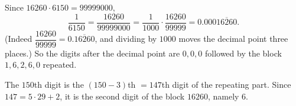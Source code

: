 Since $16260\cdot6150=99999000$,
\[
\dfrac{1}{6150}=\dfrac{16260}{99999000}=\dfrac{1}{1000}\cdot\dfrac{16260}{99999}=0.000\overline{16260}.
\]
(Indeed $\dfrac{16260}{99999}=0.\overline{16260}$, and dividing by $1000$ moves the decimal point three places.) So the digits after the decimal point are $0,0,0$ followed by the block $1,6,2,6,0$ repeated.

The $150$th digit is the $(150-3)$th $=147$th digit of the repeating part. Since $147=5\cdot29+2$, it is the second digit of the block $16260$, namely $\boxed{6}$.
